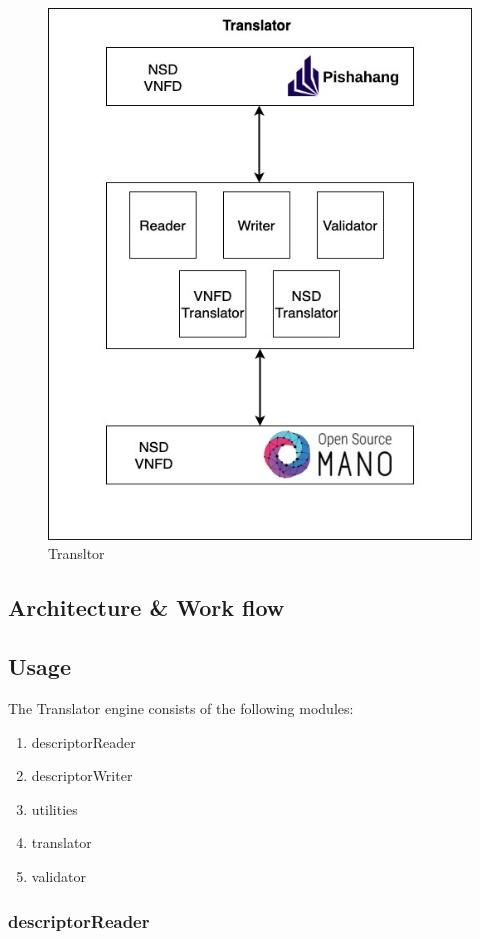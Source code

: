 \begin{figure}
	\centering
	\includegraphics[width=0.8\linewidth]{"figures/Translator"}
	\caption{Transltor}
	\label{fig:service-descriptor-translator}
\end{figure}

\subsection{Architecture \& Work flow}
\subsection{Usage}
The Translator engine consists of the following modules:
\begin{enumerate}
	\item descriptorReader
	\item descriptorWriter
	\item utilities
	\item translator
	\item validator
	
\end{enumerate}

\subsubsection{descriptorReader}

